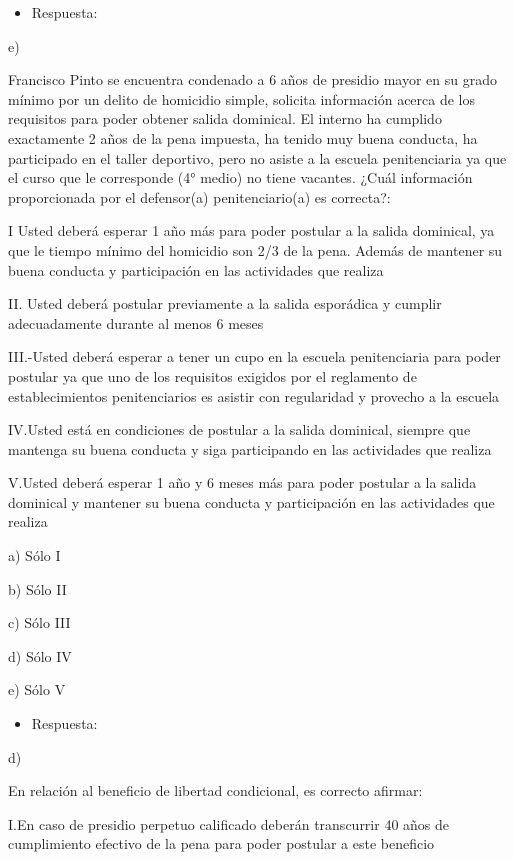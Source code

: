 \documentclass[letterpaper, 11pt]{article}
\begin{document}
\begin{itemize}
\item Respuesta:
\end{itemize}
e)


Francisco Pinto se encuentra condenado a 6 años de presidio mayor en su
grado mínimo por un delito de homicidio simple, solicita información acerca de
los requisitos para poder obtener salida dominical. El interno ha cumplido
exactamente 2 años de la pena impuesta, ha tenido muy buena conducta, ha
participado en el taller deportivo, pero no asiste a la escuela penitenciaria ya
que el curso que le corresponde (4° medio) no tiene vacantes. ¿Cuál
información proporcionada por el defensor(a) penitenciario(a) es correcta?:

I Usted deberá esperar 1 año más para poder postular a la salida dominical, ya que
le tiempo mínimo del homicidio son 2/3 de la pena. Además de mantener su buena
conducta y participación en las actividades que realiza

II. Usted deberá postular previamente a la salida esporádica y cumplir
adecuadamente durante al menos 6 meses

III.-Usted deberá esperar a tener un cupo en la escuela penitenciaria para poder
postular ya que uno de los requisitos exigidos por el reglamento de
establecimientos penitenciarios es asistir con regularidad y provecho a la escuela

IV.Usted está en condiciones de postular a la salida dominical, siempre que mantenga
su buena conducta y siga participando en las actividades que realiza

V.Usted deberá esperar 1 año y 6 meses más para poder postular a la salida
dominical y mantener su buena conducta y participación en las actividades que
realiza

a) Sólo I

b) Sólo II

c) Sólo III

d) Sólo IV

e) Sólo V

\begin{itemize}
\item Respuesta:
\end{itemize}
d)


En relación al beneficio de libertad condicional, es correcto afirmar:

I.En caso de presidio perpetuo calificado deberán transcurrir 40 años de
cumplimiento efectivo de la pena para poder postular a este beneficio
\end{document}
